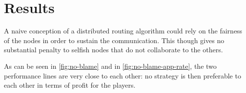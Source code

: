 \documentclass[conference]{IEEEtran}
\begin{document}
\begin{table}[h]
\vspace{0.1cm}
\caption{Relevant parameters for building the network}
\label{tab:params}
\end{table}

\section{Results} \label{sec:results}


A naive conception of a distributed routing algorithm could rely on the fairness of the nodes in order to sustain the communication.
This though gives no substantial penalty to selfish nodes that do not collaborate to the others.

As can be seen in \autoref{fig:no-blame} and in \autoref{fig:no-blame-app-rate}, the two performance lines are very close to each other: no strategy is then preferable to each other in terms of profit for the players.
\end{document}
